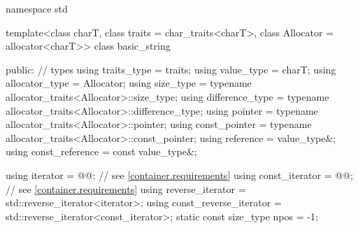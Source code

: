 %
%
%
%
%
%
%
%
%
%
%
%
%
%
\begin{codeblock}
namespace std {
  template<class charT, class traits = char_traits<charT>,
           class Allocator = allocator<charT>>
  class basic_string {
  public:
    // types
    using traits_type            = traits;
    using value_type             = charT;
    using allocator_type         = Allocator;
    using size_type              = typename allocator_traits<Allocator>::size_type;
    using difference_type        = typename allocator_traits<Allocator>::difference_type;
    using pointer                = typename allocator_traits<Allocator>::pointer;
    using const_pointer          = typename allocator_traits<Allocator>::const_pointer;
    using reference              = value_type&;
    using const_reference        = const value_type&;

    using iterator               = @@; // see \ref{container.requirements}
    using const_iterator         = @@; // see \ref{container.requirements}
    using reverse_iterator       = std::reverse_iterator<iterator>;
    using const_reverse_iterator = std::reverse_iterator<const_iterator>;
    static const size_type npos  = -1;

}}
\end{codeblock}
